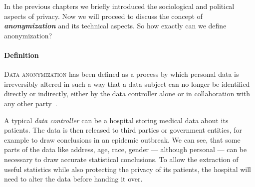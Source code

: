 In the previous chapters we briefly introduced the sociological and political aspects of privacy.
Now we will proceed to discuss the concept of \textbf{\textit{anonymization}} and its technical aspects.
So how exactly can we define anonymization?

\paragraph{Definition} \textsc{Data anonymization} has been defined as a process by which personal data is irreversibly altered in such a way that a data subject can no longer be identified directly or indirectly, either by the data controller alone or in collaboration with any other party~\cite{wiki04, iso01}.

A typical \textit{data controller} can be a hospital storing medical data about its patients.
The data is then released to third parties or government entities, for example to draw conclusions in an epidemic outbreak.
We can see, that some parts of the data like address, age, race, gender --- although personal --- can be necessary to draw accurate statistical conclusions.
To allow the extraction of useful statistics while also protecting the privacy of its patients, the hospital will need to alter the data before handing it over.


